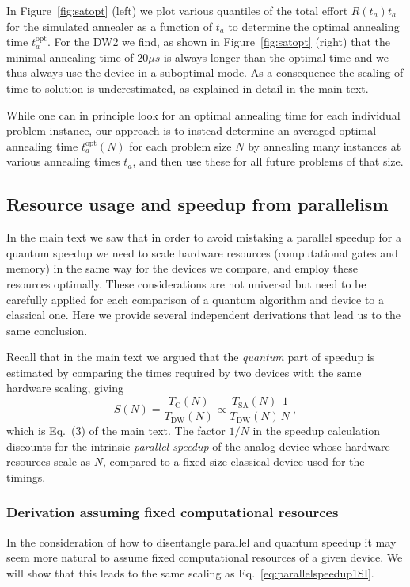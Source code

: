 In Figure~\ref{fig:satopt} (left) we plot various quantiles of the total effort $R(t_a)t_a$ for the simulated annealer as a function of $t_a$ to determine the  optimal annealing time $t_a^{\textrm{opt}}$. For the DW2 we find, as shown in Figure~\ref{fig:satopt} (right) that the minimal annealing time of  $20\mu s$  is always longer than the optimal time and we thus always use the device in a suboptimal mode. As a consequence the scaling of time-to-solution is underestimated, as explained in detail in the main text.

While one can in principle look for an optimal annealing time for each individual problem instance, our approach is to instead determine an averaged optimal annealing time $t_a^{\textrm{opt}}(N)$ for each problem size $N$ by annealing many instances at various annealing times $t_a$, and then use these for all future problems of that size.\\


\subsection{Resource usage and speedup from parallelism}

In the main text we saw that in order to avoid mistaking a parallel speedup for a quantum speedup we need to scale hardware resources  (computational gates and memory) in the same way for the devices we compare, and employ these resources optimally. These considerations are not universal but need to be carefully applied for each comparison of a quantum algorithm and device to a classical one. Here we provide several independent derivations that lead us to the same conclusion.

Recall that in the main text we argued that the {\em quantum} part of speedup is estimated by comparing the times required by two devices with the same hardware scaling, giving
%
\begin{equation}
S(N) = \frac{T_{\textrm{C}}(N)}{T_{\textrm{DW}}(N)} \propto  \frac{T_{\textrm{SA}}(N)}{T_{\textrm{DW}}(N)} \frac{1}{N}\ ,
\label{eq:parallelspeedup1SI}
\end{equation}
%
which is Eq.~(3) of the main text. The factor $1/N$ in the speedup calculation discounts for the intrinsic \emph{parallel speedup} of the analog device whose hardware resources scale as $N$, compared to a fixed size classical device used for the timings.

\subsubsection{Derivation assuming fixed computational resources}
In the consideration of how to disentangle parallel and quantum speedup it may seem more natural to assume fixed computational resources of a given device. We will show that this leads to the same scaling as Eq.~\eqref{eq:parallelspeedup1SI}.

